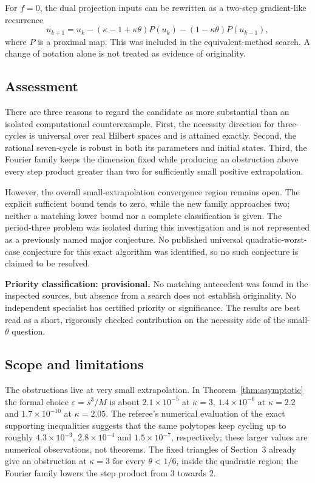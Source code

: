 \documentclass[11pt]{article}
\theoremstyle{remark}\newtheorem{remark}[theorem]{Remark}
\begin{document}
For $f=0$, the dual projection inputs can be rewritten as a two-step gradient-like recurrence
\[
 u_{k+1}=u_k-(\kappa-1+\kappa\theta)P(u_k)
                 -(1-\kappa\theta)P(u_{k-1}),
\]
where $P$ is a proximal map. This was included in the equivalent-method search. A change of notation alone is not treated as evidence of originality.

\subsection{Assessment}

There are three reasons to regard the candidate as more substantial than an isolated computational counterexample. First, the necessity direction for three-cycles is universal over real Hilbert spaces and is attained exactly. Second, the rational seven-cycle is robust in both its parameters and initial states. Third, the Fourier family keeps the dimension fixed while producing an obstruction above every step product greater than two for sufficiently small positive extrapolation.

However, the overall small-extrapolation convergence region remains open. The explicit sufficient bound tends to zero, while the new family approaches two; neither a matching lower bound nor a complete classification is given. The period-three problem was isolated during this investigation and is not represented as a previously named major conjecture. No published universal quadratic-worst-case conjecture for this exact algorithm was identified, so no such conjecture is claimed to be resolved.

\textbf{Priority classification: provisional.} No matching antecedent was found in the inspected sources, but absence from a search does not establish originality. No independent specialist has certified priority or significance. The results are best read as a short, rigorously checked contribution on the necessity side of the small-$\theta$ question.

\subsection{Scope and limitations}\label{sec:limits}
The obstructions live at very small extrapolation. In Theorem~\ref{thm:asymptotic} the formal choice $\varepsilon=s^3/M$ is about $2.1\times10^{-5}$ at $\kappa=3$, $1.4\times10^{-6}$ at $\kappa=2.2$ and $1.7\times10^{-10}$ at $\kappa=2.05$. The referee's numerical evaluation of the exact supporting inequalities suggests that the same polytopes keep cycling up to roughly $4.3\times10^{-3}$, $2.8\times10^{-4}$ and $1.5\times10^{-7}$, respectively; these larger values are numerical observations, not theorems. The fixed triangles of Section~3 already give an obstruction at $\kappa=3$ for every $\theta<1/6$, inside the quadratic region; the Fourier family lowers the step product from $3$ towards $2$.
\end{document}
